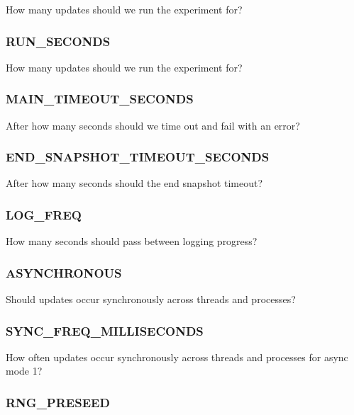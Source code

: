 
How many updates should we run the experiment for?

\subsubsection{RUN\_SECONDS}


How many updates should we run the experiment for?

\subsubsection{MAIN\_TIMEOUT\_SECONDS}


After how many seconds should we time out and fail with an error?

\subsubsection{END\_SNAPSHOT\_TIMEOUT\_SECONDS}


After how many seconds should the end snapshot timeout?

\subsubsection{LOG\_FREQ}


How many seconds should pass between logging progress?

\subsubsection{ASYNCHRONOUS}


Should updates occur synchronously across threads and processes?

\subsubsection{SYNC\_FREQ\_MILLISECONDS}


How often updates occur synchronously across threads and processes for async mode 1?

\subsubsection{RNG\_PRESEED}

